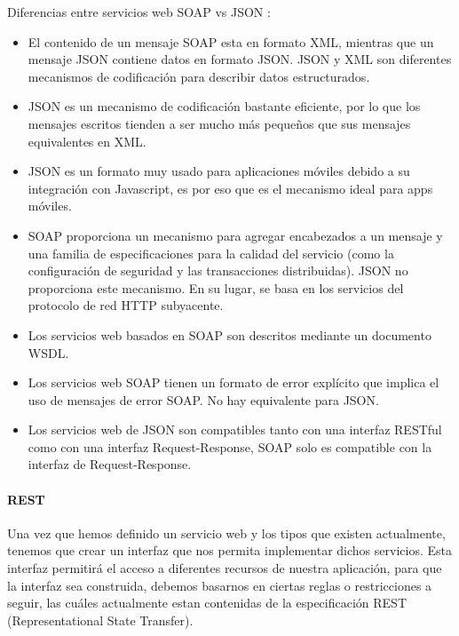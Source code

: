 Diferencias entre servicios web SOAP vs JSON \citep{MarcoTeorico11}:

\begin{itemize}
	\item El contenido de un mensaje SOAP esta en formato XML, mientras que un mensaje JSON contiene datos en formato JSON. JSON y XML son diferentes mecanismos de codificación para describir datos estructurados.
	\item JSON es un mecanismo de codificación bastante eficiente, por lo que los mensajes escritos tienden a ser mucho más pequeños que sus mensajes equivalentes en XML.
	\item JSON es un formato muy usado para aplicaciones móviles debido a su integración con Javascript, es por eso que es el mecanismo ideal para apps móviles.
	\item SOAP proporciona un mecanismo para agregar encabezados a un mensaje y una familia de especificaciones para la calidad del servicio (como la configuración de seguridad y las transacciones distribuidas). JSON no proporciona este mecanismo. En su lugar, se basa en los servicios del protocolo de red HTTP subyacente.
	\item Los servicios web basados en SOAP son descritos mediante un documento WSDL.
	\item Los servicios web SOAP tienen un formato de error explícito que implica el uso de mensajes de error SOAP. No hay equivalente para JSON.
	\item Los servicios web de JSON son compatibles tanto con una interfaz RESTful como con una interfaz Request-Response, SOAP solo es compatible con la interfaz de Request-Response. 
\end{itemize}

\paragraph{REST}
Una vez que hemos definido un servicio web y los tipos que existen actualmente, tenemos que crear un interfaz que nos permita implementar dichos servicios. Esta interfaz permitirá el acceso a diferentes recursos de nuestra aplicación, para que la interfaz sea construida, debemos basarnos en ciertas reglas o restricciones a seguir, las cuáles actualmente estan contenidas de la especificación REST (Representational State Transfer). 

